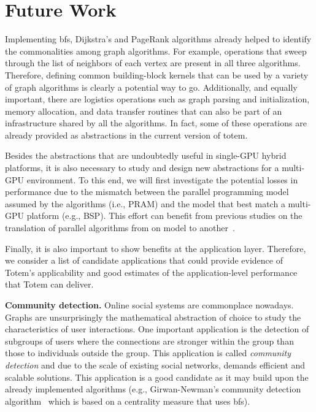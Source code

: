 \section{Future Work}
\label{sec:future}

Implementing {\sc bfs}, Dijkstra's and PageRank algorithms already helped to identify the commonalities among graph algorithms. For example, operations that sweep through the list of neighbors of each vertex are present in all three algorithms. Therefore, defining common building-block kernels that can be used by a variety of graph algorithms is clearly a potential way to go. Additionally, and equally important, there are logistics operations such as graph parsing and initialization, memory allocation, and data transfer routines that can also be part of an infrastructure shared by all the algorithms. In fact, some of these operations are already provided as abstractions in the current version of {\sc totem}.

Besides the abstractions that are undoubtedly useful in single-GPU hybrid platforms, it is also necessary to study and design new abstractions for a multi-GPU environment. To this end, we will first investigate the potential losses in performance due to the mismatch between the parallel programming model assumed by the algorithms (i.e., PRAM) and the model that best match a multi-GPU platform (e.g., BSP). This effort can benefit from previous studies on the translation of parallel algorithms from on model to another~\cite{Gerbessiotis92}. 

Finally, it is also important to show benefits at the application layer. Therefore, we consider a list of candidate applications that could provide evidence of {\sc Totem}'s applicability and good estimates of the application-level performance that {\sc Totem} can deliver. 

{\bf Community detection.} Online social systems are commonplace nowadays. Graphs are unsurprisingly the mathematical abstraction of choice to study the characteristics of user interactions. One important application is the detection of subgroups of users where the connections are stronger within the group than those to individuals outside the group. This application is called {\em community detection} and due to the scale of existing social networks, demands efficient and scalable solutions. This application is a good candidate as it may build upon the already implemented algorithms (e.g., Girwan-Newman's community detection algorithm~\cite{Newman2004} which is based on a centrality measure that uses {\sc bfs}).

